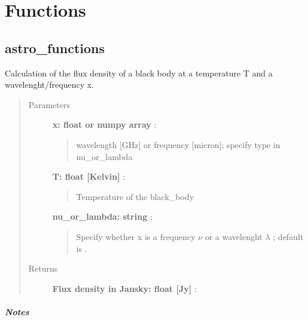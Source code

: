 \documentclass[a4paper,10pt,english]{sphinxmanual}
\begin{document}
\chapter{Functions}
\label{functions:functions}\label{functions::doc}

\section{astro\_functions}
\label{functions:astro-functions}\label{functions:module-astrolyze.functions.astro_functions}

\begin{fulllineitems}
\label{functions:astrolyze.functions.astro_functions.black_body}
Calculation of the flux density of a black body at a temperature T and a
wavelenght/frequency x.
\begin{quote}\begin{description}
\item[{Parameters }] \leavevmode
\textbf{x: float or numpy array} :
\begin{quote}

wavelength {[}GHz{]} or frequency {[}micron{]};  specify type in nu\_or\_lambda
\end{quote}

\textbf{T: float {[}Kelvin{]}} :
\begin{quote}

Temperature of the black\_body
\end{quote}

\textbf{nu\_or\_lambda: string} :
\begin{quote}

Specify whether x is a frequency $\nu$  or a wavelenght
$\lambda$ ; default is .
\end{quote}

\item[{Returns }] \leavevmode
\textbf{Flux density in Jansky: float {[}Jy{]}} :

\end{description}\end{quote}
\paragraph{Notes}


\end{fulllineitems}
\end{document}
